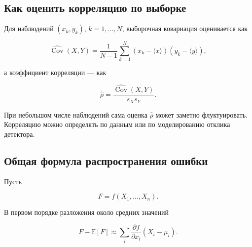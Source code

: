 \documentclass[
  russian,
  12pt,
  a4paper,
  a4paper,
  openany]{scrbook}
\begin{document}
\subsection{Как оценить корреляцию по
выборке}\label{ux43aux430ux43a-ux43eux446ux435ux43dux438ux442ux44c-ux43aux43eux440ux440ux435ux43bux44fux446ux438ux44e-ux43fux43e-ux432ux44bux431ux43eux440ux43aux435}

Для наблюдений \((x_k,y_k)\), \(k=1,\ldots,N\), выборочная ковариация
оценивается как

\[
\widehat{\operatorname{Cov}}(X,Y)
=
\frac{1}{N-1}
\sum_{k=1}^{N}
(x_k-\langle x\rangle)(y_k-\langle y\rangle),
\]

а коэффициент корреляции --- как

\[
\boxed{
\widehat\rho
=
\frac{\widehat{\operatorname{Cov}}(X,Y)}{s_Xs_Y}.
}
\]

При небольшом числе наблюдений сама оценка \(\widehat\rho\) может
заметно флуктуировать. Корреляцию можно определять по данным или по
моделированию отклика детектора.

\subsection{Общая формула распространения
ошибки}\label{ux43eux431ux449ux430ux44f-ux444ux43eux440ux43cux443ux43bux430-ux440ux430ux441ux43fux440ux43eux441ux442ux440ux430ux43dux435ux43dux438ux44f-ux43eux448ux438ux431ux43aux438}

Пусть

\[
F=f(X_1,\ldots,X_n).
\]

В первом порядке разложения около средних значений

\[
F-\mathbb E[F]
\approx
\sum_i
\frac{\partial f}{\partial x_i}
(X_i-\mu_i).
\]
\end{document}
